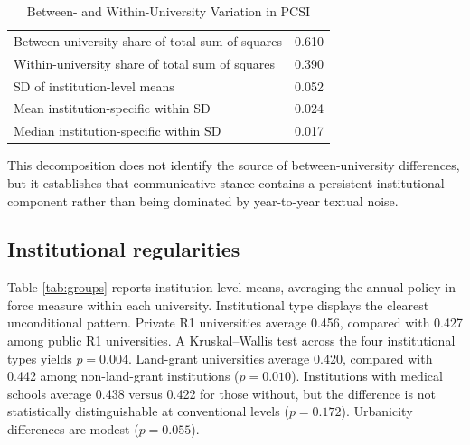 \documentclass[12pt]{article}
\begin{document}
\begin{table}[H]
\centering
\caption{Between- and Within-University Variation in PCSI}
\label{tab:variance}
\small
\begin{tabular}{lr}
\toprule
Between-university share of total sum of squares & 0.610\\
Within-university share of total sum of squares & 0.390\\
SD of institution-level means & 0.052\\
Mean institution-specific within SD & 0.024\\
Median institution-specific within SD & 0.017\\
\bottomrule
\end{tabular}
\end{table}

This decomposition does not identify the source of between-university differences, but it establishes that communicative stance contains a persistent institutional component rather than being dominated by year-to-year textual noise.

\subsection{Institutional regularities}

Table \ref{tab:groups} reports institution-level means, averaging the annual policy-in-force measure within each university. Institutional type displays the clearest unconditional pattern. Private R1 universities average 0.456, compared with 0.427 among public R1 universities. A Kruskal--Wallis test across the four institutional types yields $p=0.004$. Land-grant universities average 0.420, compared with 0.442 among non-land-grant institutions ($p=0.010$). Institutions with medical schools average 0.438 versus 0.422 for those without, but the difference is not statistically distinguishable at conventional levels ($p=0.172$). Urbanicity differences are modest ($p=0.055$).
\end{document}
